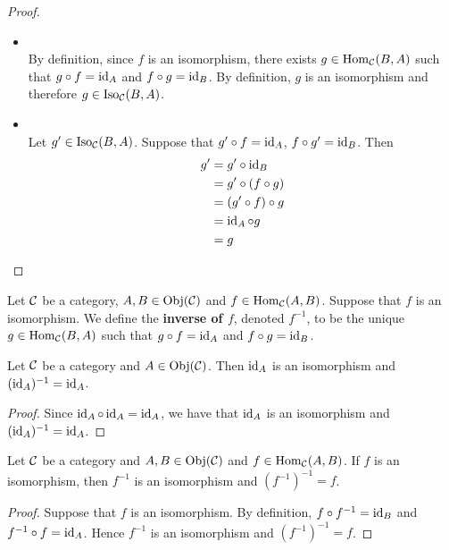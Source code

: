\documentclass{book}
\begin{document}
	\begin{proof}\
		\begin{itemize}
			\item {} \\
			By definition, since $f$ is an isomorphism, there exists $g \in \operatorname{Hom}_{\mathcal{C}}(B, A)$ such that $g \circ f = \operatorname{id}_{A}$ and $f \circ g = \operatorname{id}_B$. By definition, $g$ is an isomorphism and therefore $g \in \operatorname{Iso}_{\mathcal{C}}(B, A)$.
			\item \tbf{Uniqueness: } \\
			Let $g' \in \operatorname{Iso}_{\mathcal{C}}(B, A)$. Suppose that $g' \circ f = \operatorname{id}_A$, $f \circ g' = \operatorname{id}_B$. Then 
			\begin{align*}
				g'
				& = g' \circ \operatorname{id}_{B} \\
				& = g' \circ (f \circ g) \\
				& = (g' \circ f) \circ  g \\
				& = \operatorname{id}_A \circ g \\
				& = g
			\end{align*}
		\end{itemize}
	\end{proof}

	\begin{defn} 
		Let $\mathcal{C}$ be a category, $A,B \in \operatorname{Obj}(\mathcal{C})$ and $f \in \operatorname{Hom}_{\mathcal{C}}(A, B)$. Suppose that $f$ is an isomorphism. We define the \textbf{inverse of $f$}, denoted $f^{-1}$, to be the unique $g \in \operatorname{Hom}_{\mathcal{C}}(B, A)$ such that $g \circ f = \operatorname{id}_A$ and $f \circ g = \operatorname{id}_B$.
	\end{defn}
	
	\begin{ex} 
		Let $\mathcal{C}$ be a category and $A \in \operatorname{Obj}(\mathcal{C})$. Then $\operatorname{id}_A$ is an isomorphism and $(\operatorname{id}_A)^{-1} = \operatorname{id}_A$. 
	\end{ex}
	
	\begin{proof}
		Since $\operatorname{id}_A \circ \operatorname{id}_A = \operatorname{id}_A$, we have that $\operatorname{id}_A$ is an isomorphism and $(\operatorname{id}_A)^{-1} = \operatorname{id}_A$.
	\end{proof}
	
	\begin{ex} 
		Let $\mathcal{C}$ be a category and $A, B \in \operatorname{Obj}(\mathcal{C})$ and $f \in \operatorname{Hom}_{\mathcal{C}}(A,B)$. If $f$ is an isomorphism, then $f^{-1}$ is an isomorphism and $(f^{-1})^{-1} = f$.
	\end{ex}
	
	\begin{proof}
		Suppose that $f$ is an isomorphism. By definition, $f \circ f^{-1} = \operatorname{id}_{B}$ and $f^{-1} \circ f = \operatorname{id}_A$. Hence $f^{-1}$ is an isomorphism and $(f^{-1})^{-1} = f$.
	\end{proof}
	
\end{document}
